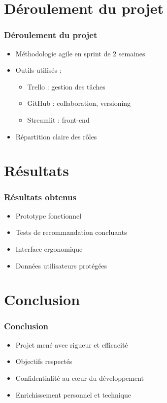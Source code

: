 \documentclass{beamer}
\begin{document}
\section{Déroulement du projet}
\begin{frame}
    \frametitle{Déroulement du projet}
    \begin{itemize}
        \item Méthodologie agile en sprint de 2 semaines
        \item Outils utilisés :
        \begin{itemize}
            \item Trello : gestion des tâches
            \item GitHub : collaboration, versioning
            \item Streamlit : front-end
        \end{itemize}
        \item Répartition claire des rôles
    \end{itemize}
\end{frame}

\section{Résultats}
\begin{frame}
    \frametitle{Résultats obtenus}
    \begin{itemize}
        \item Prototype fonctionnel
        \item Tests de recommandation concluants
        \item Interface ergonomique
        \item Données utilisateurs protégées
    \end{itemize}
\end{frame}

\section{Conclusion}
\begin{frame}
    \frametitle{Conclusion}
    \begin{itemize}
        \item Projet mené avec rigueur et efficacité
        \item Objectifs respectés
        \item Confidentialité au cœur du développement
        \item Enrichissement personnel et technique
    \end{itemize}
\end{frame}
\end{document}
